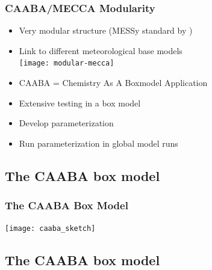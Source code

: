 \documentclass[t]{beamer}
\begin{document}
\begin{frame}

  \frametitle{CAABA/MECCA Modularity}

  \begin{itemize}
  \item Very modular structure (MESSy standard by \citet{1664})
  \item Link to different meteorological base models\\
    \texttt{[image: modular-mecca]}
  \item CAABA = Chemistry As A Boxmodel Application
  \item Extensive testing in a box model
  \item Develop parameterization
  \item Run parameterization in global model runs
  \end{itemize}

\end{frame}


\subsection{The CAABA box model}

\begin{frame}

  \frametitle{The CAABA Box Model}

  \texttt{[image: caaba\_sketch]}

\end{frame}


\subsection{The CAABA box model}
\end{document}
